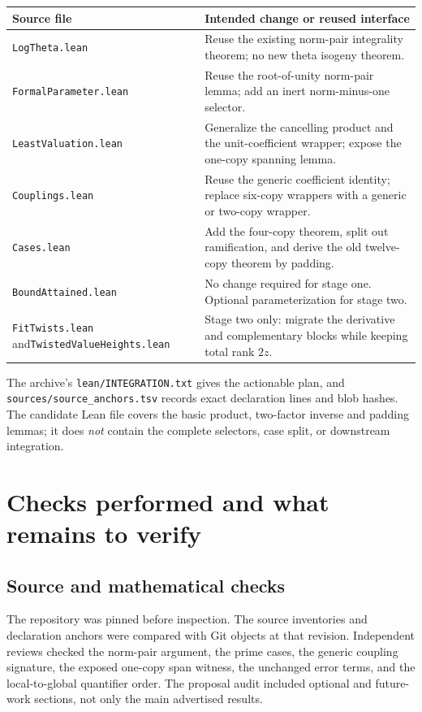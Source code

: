 \documentclass[11pt,letterpaper]{article}
\theoremstyle{remark}\newtheorem{remark}[theorem]{Remark}
\begin{document}
\begin{longtable}{@{}p{.31\linewidth}p{.63\linewidth}@{}}
\toprule
Source file & Intended change or reused interface\\
\midrule\endhead
\texttt{LogTheta.lean} & Reuse the existing norm-pair integrality theorem;
no new theta isogeny theorem.\\[3pt]
\texttt{FormalParameter.lean} & Reuse the root-of-unity norm-pair lemma;
add an inert norm-minus-one selector.\\[3pt]
\texttt{LeastValuation.lean} & Generalize the cancelling product and the
unit-coefficient wrapper; expose the one-copy spanning lemma.\\[3pt]
\texttt{Couplings.lean} & Reuse the generic coefficient identity; replace
six-copy wrappers with a generic or two-copy wrapper.\\[3pt]
\texttt{Cases.lean} & Add the four-copy theorem, split out ramification,
and derive the old twelve-copy theorem by padding.\\[3pt]
\texttt{BoundAttained.lean} & No change required for stage one. Optional
parameterization for stage two.\\[3pt]
\texttt{FitTwists.lean} and\newline\texttt{TwistedValueHeights.lean}
& Stage two only: migrate the derivative and complementary blocks while
keeping total rank $2z$.\\
\bottomrule
\end{longtable}

The archive's \texttt{lean/INTEGRATION.txt} gives the actionable plan,
and \texttt{sources/source\_anchors.tsv} records exact declaration lines
and blob hashes. The candidate Lean file covers the basic product,
two-factor inverse and padding lemmas; it does \emph{not} contain the
complete selectors, case split, or downstream integration.

\section{Checks performed and what remains to verify}
\label{sec:checks}

\subsection{Source and mathematical checks}

The repository was pinned before inspection. The source inventories and
declaration anchors were compared with Git objects at that revision.
Independent reviews checked the norm-pair argument, the prime cases,
the generic coupling signature, the exposed one-copy span witness,
the unchanged error terms, and the local-to-global quantifier order.
The proposal audit included optional and future-work sections, not only
the main advertised results.
\end{document}
